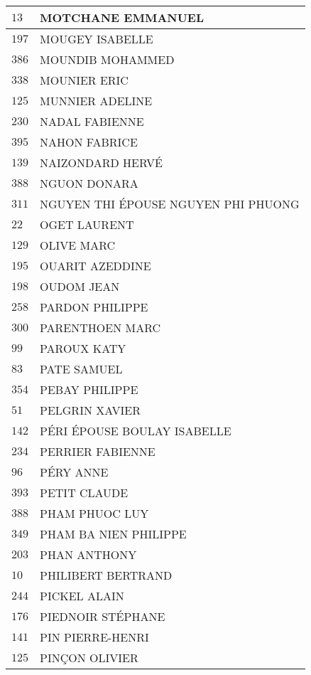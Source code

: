 \begin{xltabular}{\linewidth}{|l|X|}
    $13$ & MOTCHANE EMMANUEL \\
    \hline
    $197$ & MOUGEY ISABELLE \\
    \hline
    $386$ & MOUNDIB MOHAMMED \\
    \hline
    $338$ & MOUNIER ERIC \\
    \hline
    $125$ & MUNNIER ADELINE \\
    \hline
    $230$ & NADAL FABIENNE \\
    \hline
    $395$ & NAHON FABRICE \\
    \hline
    $139$ & NAIZONDARD HERVÉ \\
    \hline
    $388$ & NGUON DONARA \\
    \hline
    $311$ & NGUYEN THI ÉPOUSE NGUYEN PHI PHUONG \\
    \hline
    $22$ & OGET LAURENT \\
    \hline
    $129$ & OLIVE MARC \\
    \hline
    $195$ & OUARIT AZEDDINE \\
    \hline
    $198$ & OUDOM JEAN \\
    \hline
    $258$ & PARDON PHILIPPE \\
    \hline
    $300$ & PARENTHOEN MARC \\
    \hline
    $99$ & PAROUX KATY \\
    \hline
    $83$ & PATE SAMUEL \\
    \hline
    $354$ & PEBAY PHILIPPE \\
    \hline
    $51$ & PELGRIN XAVIER \\
    \hline
    $142$ & PÉRI ÉPOUSE BOULAY ISABELLE \\
    \hline
    $234$ & PERRIER FABIENNE \\
    \hline
    $96$ & PÉRY ANNE \\
    \hline
    $393$ & PETIT CLAUDE \\
    \hline
    $388$ & PHAM PHUOC LUY \\
    \hline
    $349$ & PHAM BA NIEN PHILIPPE \\
    \hline
    $203$ & PHAN ANTHONY \\
    \hline
    $10$ & PHILIBERT BERTRAND \\
    \hline
    $244$ & PICKEL ALAIN \\
    \hline
    $176$ & PIEDNOIR STÉPHANE \\
    \hline
    $141$ & PIN PIERRE-HENRI \\
    \hline
    $125$ & PINÇON OLIVIER \\

\end{xltabular}
